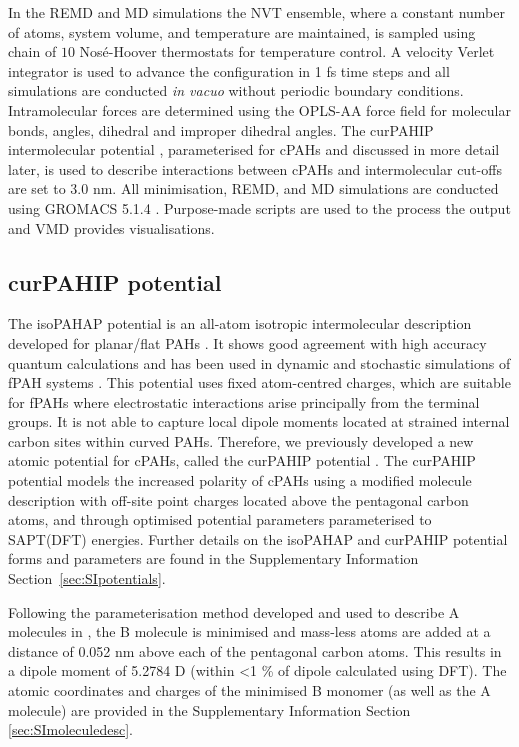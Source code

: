In the REMD and MD simulations the NVT ensemble, where a constant number of atoms, system volume, and temperature are maintained, is sampled using chain of $10$ Nos\'{e}-Hoover thermostats for temperature control. A velocity Verlet integrator \cite{Verlet_1967} is used to advance the configuration in 1 fs time steps and all simulations are conducted \textit{in vacuo} without periodic boundary conditions.  Intramolecular forces are determined using the OPLS-AA force field \cite{Kaminski2001opls} for molecular bonds, angles, dihedral and improper dihedral angles. The curPAHIP intermolecular potential \cite{bowal2019ion}, parameterised for cPAHs and discussed in more detail later, is used to describe interactions between cPAHs and intermolecular cut-offs are set to $3.0$ nm. All minimisation, REMD, and MD simulations are conducted using GROMACS 5.1.4 \cite{Abraham2015}. Purpose-made scripts are used to the process the output and VMD \cite{Humphrey1996} provides visualisations.

\subsection{curPAHIP potential} 
The isoPAHAP potential is an all-atom isotropic intermolecular description developed for planar/flat PAHs \cite{totton2010first}. It shows good agreement with high accuracy quantum calculations and has been used in dynamic and stochastic simulations of fPAH systems \cite{Totton2012quantitative,bowal2019sphere,Grancic2016,Pascazio2017}. This potential uses fixed atom-centred charges, which are suitable for fPAHs where electrostatic interactions arise principally from the terminal groups. It is not able to capture local dipole moments located at strained internal carbon sites within curved PAHs. Therefore, we previously developed a new atomic potential for cPAHs, called the curPAHIP potential \cite{bowal2019ion}. The curPAHIP potential models the increased polarity of cPAHs using a modified molecule description with off-site point charges located above the pentagonal carbon atoms, and through optimised potential parameters parameterised to SAPT(DFT) energies. Further details on the isoPAHAP and curPAHIP potential forms and parameters are found in the Supplementary Information Section~\ref{sec:SIpotentials}.

Following the parameterisation method developed and used to describe A molecules in \citet{bowal2019ion}, the B molecule is minimised and mass-less atoms are added at a distance of 0.052 nm above each of the pentagonal carbon atoms. This results in a dipole moment of 5.2784 D (within <1 \% of dipole calculated using DFT). The atomic coordinates and charges of the minimised B monomer (as well as the A molecule) are provided in the Supplementary Information Section \ref{sec:SImoleculedesc}.


